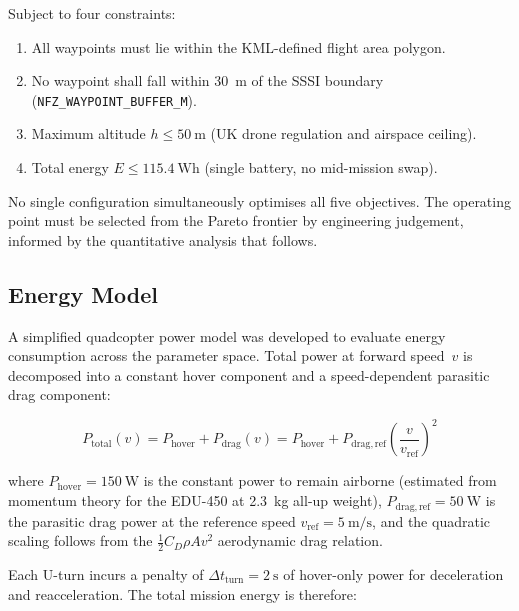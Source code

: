 \noindent Subject to four constraints:

\begin{enumerate}[label=\textbf{R\arabic*}]
  \item All waypoints must lie within the KML-defined flight area polygon.
  \item No waypoint shall fall within \SI{30}{\metre} of the SSSI boundary (\texttt{NFZ\_WAYPOINT\_BUFFER\_M}).
  \item Maximum altitude $h \leq \SI{50}{\metre}$ (UK drone regulation and airspace ceiling).
  \item Total energy $E \leq \SI{115.4}{\watt\hour}$ (single battery, no mid-mission swap).
\end{enumerate}

\noindent No single configuration simultaneously optimises all five objectives.
The operating point must be selected from the Pareto frontier by engineering judgement, informed by the quantitative analysis that follows.

\subsection{Energy Model}\label{sec:energy-model}

A simplified quadcopter power model was developed to evaluate energy consumption across the parameter space.
Total power at forward speed~$v$ is decomposed into a constant hover component and a speed-dependent parasitic drag component:

\begin{equation}\label{eq:power-model}
  P_{\mathrm{total}}(v) = P_{\mathrm{hover}} + P_{\mathrm{drag}}(v) = P_{\mathrm{hover}} + P_{\mathrm{drag,ref}} \left(\frac{v}{v_{\mathrm{ref}}}\right)^{\!2}
\end{equation}

\noindent where $P_{\mathrm{hover}} = \SI{150}{\watt}$ is the constant power to remain airborne (estimated from momentum theory for the EDU-450 at \SI{2.3}{\kilo\gram} all-up weight), $P_{\mathrm{drag,ref}} = \SI{50}{\watt}$ is the parasitic drag power at the reference speed $v_{\mathrm{ref}} = \SI{5}{\metre\per\second}$, and the quadratic scaling follows from the $\tfrac{1}{2} C_D \rho A v^2$ aerodynamic drag relation.

Each U-turn incurs a penalty of $\Delta t_{\mathrm{turn}} = \SI{2}{\second}$ of hover-only power for deceleration and reacceleration.
The total mission energy is therefore:

